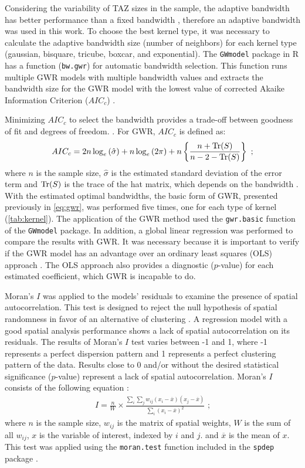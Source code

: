 Considering the variability of TAZ sizes in the sample, the adaptive bandwidth has better performance than a fixed bandwidth \cite{Huang2018}, therefore an adaptive bandwidth was used in this work. To choose the best kernel type, it was necessary to calculate the adaptive bandwidth size (number of neighbors) for each kernel type (gaussian, bisquare, tricube, boxcar, and exponential). The \verb|GWmodel| package in R has a function (\verb|bw.gwr|) for automatic bandwidth selection. This function runs multiple GWR models with multiple bandwidth values and extracts the bandwidth size for the GWR model with the lowest value of corrected Akaike Information Criterion ($AIC_c$) \cite{Gollini2013}.

Minimizing $AIC_c$ to select the bandwidth provides a trade-off between goodness of fit and degrees of freedom. \cite{Fotheringham2002}. For GWR, $AIC_c$ is defined as: \begin{align}
    AIC_c = 2n\log_{e}\left(\hat\sigma\right) + n \log_{e}\left(2\pi\right) + n\left\{\frac{n + \operatorname{Tr}(S)}{n - 2 - \operatorname{Tr}(S)}\right\} \mbox{ ;}
\end{align} where $n$ is the sample size, $\hat\sigma$ is the estimated standard deviation of the error term and $\operatorname{Tr}(S)$ is the trace of the hat matrix, which depends on the bandwidth \cite{Fotheringham2002}. With the estimated optimal bandwidths, the basic form of GWR, presented previously in \autoref{eq:gwr}, was performed five times, one for each type of kernel (\autoref{tab:kernel}). The application of the GWR method used the \verb|gwr.basic| function of the \verb|GWmodel| package. In addition, a global linear regression was performed to compare the results with GWR. It was necessary because it is important to verify if the GWR model has an advantage over an ordinary least squares (OLS) approach \cite{Brunsdon2010}. The OLS approach also provides a diagnostic ($p$-value) for each estimated coefficient, which GWR is incapable to do.

Moran's $I$ was applied to the models' residuals to examine the presence of spatial autocorrelation. This test is designed to reject the null hypothesis of spatial randomness in favor of an alternative of clustering \cite{anselinLocalSpatialAutocorrelation2020}. A regression model with a good spatial analysis performance shows a lack of spatial autocorrelation on its residuals. The results of Moran's $I$ test varies between -1 and 1, where -1 represents a perfect dispersion pattern and 1 represents a perfect clustering pattern of the data. Results close to 0 and/or without the desired statistical significance ($p$-value) represent a lack of spatial autocorrelation. Moran's $I$ consists of the following equation \cite{Getis2010}: \begin{align}
    I = \frac{n}{W} \times \frac{\sum_i \sum_j w_{ij} (x_i - \overline{x})(x_j - \overline{x})}{\sum_i (x_i - \overline{x})^2} \mbox{ ;}
    \label{eq:global_moran}
\end{align} where $n$ is the sample size, $w_{ij}$ is the matrix of spatial weights, $W$ is the sum of all $w_{ij}$, $x$ is the variable of interest, indexed by $i$ and $j$. and $\overline{x}$ is the mean of $x$. This test was applied using the \verb|moran.test| function included in the \verb|spdep| package \cite{Bivand2013}. 

